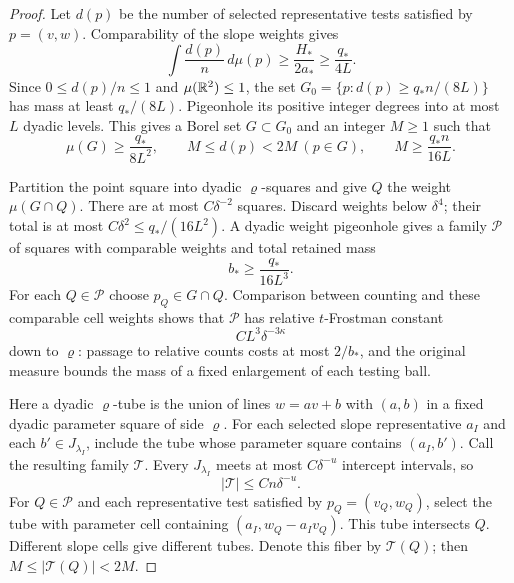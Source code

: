 \begin{proof}
Let $d(p)$ be the number of selected representative tests
satisfied by $p=(v,w)$. Comparability of the slope weights gives
\[
 \int\frac{d(p)}n\,d\mu(p)
 \ge\frac{H_*}{2a_*}\ge\frac{q_*}{4L}.
\]
Since $0\le d(p)/n\le1$ and $\mu(\mathbb R^2)\le1$, the set
$G_0=\{p:d(p)\ge q_*n/(8L)\}$ has mass at least $q_*/(8L)$.
Pigeonhole its positive integer degrees into at most $L$
dyadic levels. This gives a Borel set $G\subset G_0$ and an
integer $M\ge1$ such that
\begin{equation}\label{eq:robust-projection-degrees}
 \mu(G)\ge\frac{q_*}{8L^2},\qquad
 M\le d(p)<2M\ (p\in G),\qquad
 M\ge\frac{q_*n}{16L}.
\end{equation}

Partition the point square into dyadic $\varrho$-squares and give
$Q$ the weight $\mu(G\cap Q)$. There are at most
$C\delta^{-2}$ squares. Discard weights below $\delta^4$; their
total is at most $C\delta^2\le q_*/(16L^2)$. A dyadic weight
pigeonhole gives a family $\mathcal P$ of squares with comparable
weights and total retained mass
\begin{equation}\label{eq:robust-projection-point-mass}
 b_*\ge\frac{q_*}{16L^3}.
\end{equation}
For each $Q\in\mathcal P$ choose $p_Q\in G\cap Q$.
Comparison between counting and these comparable cell weights
shows that $\mathcal P$ has relative $t$-Frostman constant
\begin{equation}\label{eq:robust-projection-point-constant}
 CL^3\delta^{-3\kappa}
\end{equation}
down to $\varrho$: passage to relative counts costs at most
$2/b_*$, and the original measure bounds the mass of a fixed
enlargement of each testing ball.

Here a dyadic $\varrho$-tube is the union of lines
$w=av+b$ with $(a,b)$ in a fixed dyadic parameter square of side
$\varrho$. For each selected slope representative $a_I$ and each
$b'\in J_{\lambda_I}$, include the tube whose parameter square
contains $(a_I,b')$. Call the resulting family $\mathcal T$.
Every $J_{\lambda_I}$ meets at most $C\delta^{-u}$ intercept
intervals, so
\begin{equation}\label{eq:robust-projection-tube-upper}
 |\mathcal T|\le Cn\delta^{-u}.
\end{equation}
For $Q\in\mathcal P$ and each representative test satisfied by
$p_Q=(v_Q,w_Q)$, select the tube with parameter cell containing
$(a_I,w_Q-a_Iv_Q)$. This tube intersects $Q$. Different slope
cells give different tubes. Denote this fiber by $\mathcal T(Q)$;
then $M\le|\mathcal T(Q)|<2M$.


\end{proof}
